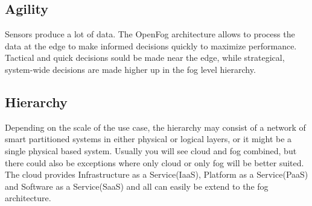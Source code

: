 \subsection{Agility}

Sensors produce a lot of data. The OpenFog architecture allows to process the data at the edge to make informed decisions quickly to maximize performance. Tactical and quick decisions sould be made near the edge, while strategical, system-wide decisions are made higher up in the fog level hierarchy.\cite[p. 15]{OpenFog}

\subsection{Hierarchy}

Depending on the scale of the use case, the hierarchy may consist of a network of smart partitioned systems in either physical or logical layers, or it might be a single physical based system. Usually you will see cloud and fog combined, but there could also be exceptions where only cloud or only fog will be better suited. The cloud provides Infrastructure as a Service(IaaS), Platform as a Service(PaaS) and Software as a Service(SaaS) and all can easily be extend to the fog architecture.\cite[p. 16]{OpenFog}